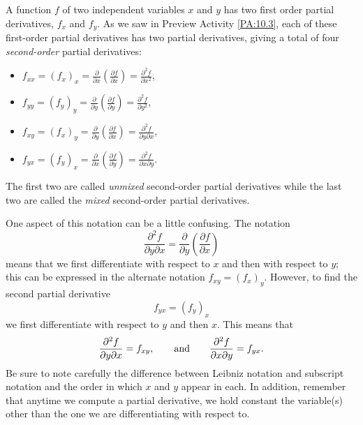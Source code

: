 A function $f$ of two independent variables $x$ and $y$ has two first
order partial derivatives, $f_x$ and $f_y$. As we saw in Preview
Activity \ref{PA:10.3}, each of these first-order partial derivatives
has two partial derivatives, giving a total of four {\em second-order} partial derivatives:
\begin{itemize}
\item $f_{xx} = (f_x)_x = \frac{\partial}{\partial x} 
  \left(\frac{\partial
    f}{\partial x}\right) = 
  \frac{\partial^2 f}{\partial x^2}$,
\item $f_{yy} = (f_y)_y=\frac{\partial}{\partial y} 
  \left(\frac{\partial
    f}{\partial y}\right) = 
  \frac{\partial^2 f}{\partial y^2}$,
\item $f_{xy} = (f_x)_y=\frac{\partial}{\partial y} 
  \left(\frac{\partial
    f}{\partial x}\right) = 
  \frac{\partial^2 f}{\partial y \partial x}$,
\item $f_{yx}=(f_y)_x=\frac{\partial}{\partial x} 
  \left(\frac{\partial
    f}{\partial y}\right) = 
  \frac{\partial^2 f}{\partial x \partial y}$.
\end{itemize}

The first two are called \emph{unmixed} second-order partial
derivatives while the
last two are called the \emph{mixed} second-order partial
derivatives.

One aspect of this notation can be a little confusing.  The notation
$$
\frac{\partial^2 f}{\partial y\partial x} = \frac{\partial}{\partial
  y}\left(\frac{\partial f}{\partial x}\right)
$$
means that we first differentiate with respect to $x$ and then with
respect to $y$; this can be expressed in the alternate notation $f_{xy} = (f_x)_y$.  However, to find the second partial derivative
$$
f_{yx} = (f_y)_x
$$
we first differentiate with respect to $y$ and then $x$.  This means
that
$$
\frac{\partial^2 f}{\partial y\partial x} = f_{xy}, 
\hspace*{20pt}
\mbox{and}
\hspace*{20pt}
\frac{\partial^2 f}{\partial x\partial y} = f_{yx}.
$$
Be sure to note carefully the difference between Leibniz notation and subscript notation and the order in which $x$ and $y$ appear in each.  In addition, remember that anytime we compute a partial derivative, we hold constant the variable(s) other than the one we are differentiating with respect to.



